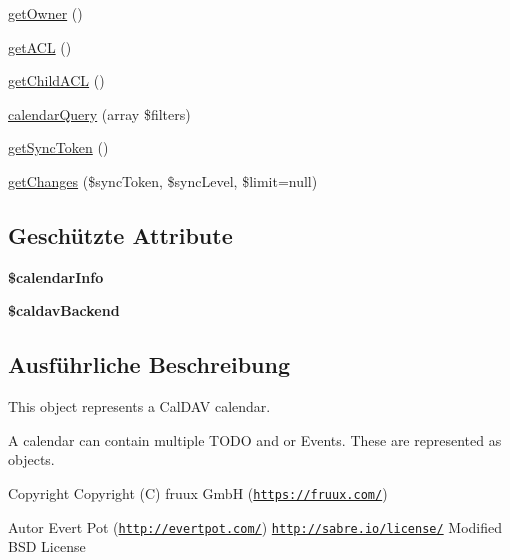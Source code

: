 \begin{DoxyCompactItemize}
\item 
\mbox{\hyperlink{class_sabre_1_1_cal_d_a_v_1_1_calendar_aa3425682a478cc4c10f8828290e55665}{get\+Owner}} ()
\item 
\mbox{\hyperlink{class_sabre_1_1_cal_d_a_v_1_1_calendar_a48cd2a6648e33d44c9e0e6ee0ba12407}{get\+A\+CL}} ()
\item 
\mbox{\hyperlink{class_sabre_1_1_cal_d_a_v_1_1_calendar_a2452b92f425e3b2c204734af593a4c1d}{get\+Child\+A\+CL}} ()
\item 
\mbox{\hyperlink{class_sabre_1_1_cal_d_a_v_1_1_calendar_a2a1378d9365a94fb2a301cf46e820b1a}{calendar\+Query}} (array \$filters)
\item 
\mbox{\hyperlink{class_sabre_1_1_cal_d_a_v_1_1_calendar_a74fa64b6484a0cd7f3300d89a96d74d9}{get\+Sync\+Token}} ()
\item 
\mbox{\hyperlink{class_sabre_1_1_cal_d_a_v_1_1_calendar_a3df48ca7fbf0f4bed2cdaa3e9d3f651e}{get\+Changes}} (\$sync\+Token, \$sync\+Level, \$limit=null)
\end{DoxyCompactItemize}
\subsection*{Geschützte Attribute}
\begin{DoxyCompactItemize}
\item 
\mbox{\label{class_sabre_1_1_cal_d_a_v_1_1_calendar_a6f93b947922784f9fe93400f93379597}} 
{\bfseries \$calendar\+Info}
\item 
\mbox{\label{class_sabre_1_1_cal_d_a_v_1_1_calendar_ae26af1f4a174000cb63fd4746f8353ad}} 
{\bfseries \$caldav\+Backend}
\end{DoxyCompactItemize}


\subsection{Ausführliche Beschreibung}
This object represents a Cal\+D\+AV calendar.

A calendar can contain multiple T\+O\+DO and or Events. These are represented as  objects.

\begin{DoxyCopyright}{Copyright}
Copyright (C) fruux GmbH (\href{https://fruux.com/}{\tt https\+://fruux.\+com/}) 
\end{DoxyCopyright}
\begin{DoxyAuthor}{Autor}
Evert Pot (\href{http://evertpot.com/}{\tt http\+://evertpot.\+com/})  \href{http://sabre.io/license/}{\tt http\+://sabre.\+io/license/} Modified B\+SD License 
\end{DoxyAuthor}


